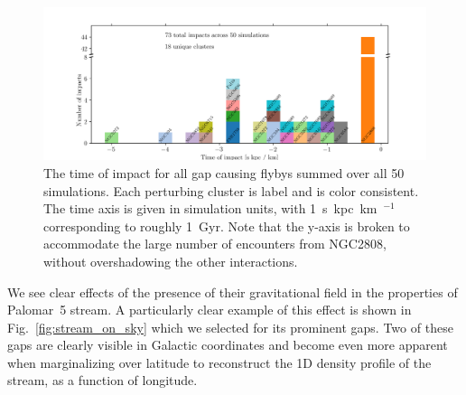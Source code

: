 \documentclass[draft]{aa}
\begin{document}
    \begin{figure}
      \centering
      \includegraphics[width=\linewidth]{histogram_impact_time.png}
      \caption{The time of impact for all gap causing flybys summed over all 50 simulations. Each perturbing cluster is label and is color consistent. The time axis is given in simulation units, with 1~s~kpc~km~$^{-1}$ corresponding to roughly 1~Gyr. Note that the y-axis is broken to accommodate the large number of encounters from NGC2808, without overshadowing the other interactions.}
      \label{fig:histogram_impact_time}
    \end{figure}

    
    We see clear effects of the presence of their gravitational field in the properties of Palomar~5 stream. A particularly clear example of this effect is shown in Fig.~\ref{fig:stream_on_sky} which we selected for its prominent gaps. Two of these gaps are clearly visible in Galactic coordinates and become even more apparent when marginalizing over latitude to reconstruct the 1D density profile of the stream, as a function of longitude.     
\end{document}

